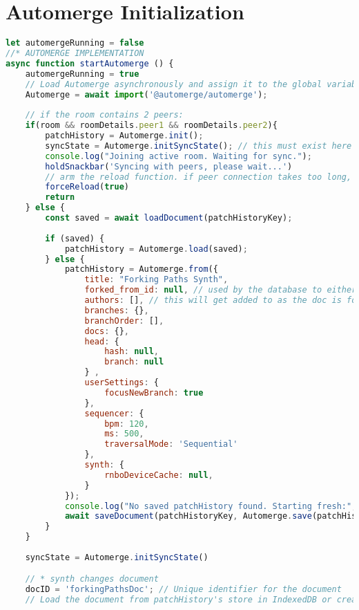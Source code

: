 \section{Automerge Initialization}

\begin{lstlisting}[language=JavaScript, caption={Initial peer setup when joining a room}, label={lst:automerge-initialization}]
let automergeRunning = false
//* AUTOMERGE IMPLEMENTATION
async function startAutomerge () {
    automergeRunning = true
    // Load Automerge asynchronously and assign it to the global variable
    Automerge = await import('@automerge/automerge');
    
    // if the room contains 2 peers:
    if(room && roomDetails.peer1 && roomDetails.peer2){
        patchHistory = Automerge.init();
        syncState = Automerge.initSyncState(); // this must exist here
        console.log("Joining active room. Waiting for sync.");
        holdSnackbar('Syncing with peers, please wait...')
        // arm the reload function. if peer connection takes too long, it will reload the page
        forceReload(true)
        return
    } else {
        const saved = await loadDocument(patchHistoryKey);
        
        if (saved) {
            patchHistory = Automerge.load(saved);
        } else {
            patchHistory = Automerge.from({
                title: "Forking Paths Synth",
                forked_from_id: null, // used by the database to either determine this as the root of a tree of patch histories, or a fork from a stored history 
                authors: [], // this will get added to as the doc is forked from the database
                branches: {},
                branchOrder: [],
                docs: {},
                head: {
                    hash: null,
                    branch: null
                } ,
                userSettings: {
                    focusNewBranch: true 
                },
                sequencer: {
                    bpm: 120,
                    ms: 500,
                    traversalMode: 'Sequential'
                },
                synth: {
                    rnboDeviceCache: null,
                }
            });
            console.log("No saved patchHistory found. Starting fresh:", patchHistoryKey);
            await saveDocument(patchHistoryKey, Automerge.save(patchHistory));
        }
    }
            
    syncState = Automerge.initSyncState()

    // * synth changes document
    docID = 'forkingPathsDoc'; // Unique identifier for the document
    // Load the document from patchHistory's store in IndexedDB or create a new one if it doesn't exist


\end{lstlisting}
